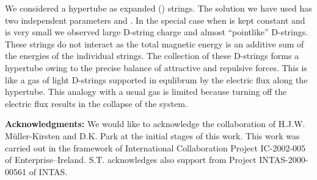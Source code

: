 \documentclass[a4paper,12pt]{article}
\begin{document}
We considered a hypertube as expanded (\coordHE{}) strings. The solution we have used has two independent parameters \coordHE{} and \myHighlight{$\gamma$}\coordHE{}. In the special case when \coordHE{} is kept constant and \myHighlight{$\gamma$}\coordHE{} is very small we observed large D-string charge and almost ``pointlike'' D-strings. These strings do not interact as the total magnetic energy is an additive sum of the energies of the individual strings. The collection of these D-strings forms a hypertube owing to the precise balance of attractive and repulsive forces. This is like a gas of light D-strings supported in equlibrum by the electric flux along the hypertube. This analogy with a usual gas is limited because turning off the electric flux results in the collapse of the system. 



\smallskip

{\bf Acknowledgments:}
\newline
We would like to acknowledge the collaboration of H.J.W. M\"uller-Kirsten and D.K. Park at the initial stages of this work. This work was carried out in the framework of International Collaboration Project IC-2002-005 of Enterprise--Ireland. S.T. acknowledges also support from Project INTAS-2000-00561 of INTAS.
\end{document}
